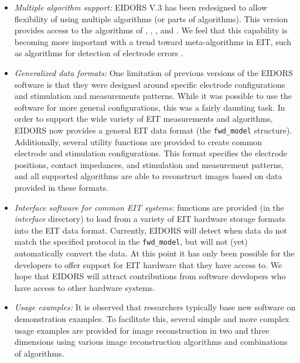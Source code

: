 \documentclass[12pt]{iopart}
\begin{document}
\begin{itemize}

  \item {\em Multiple algorithm support:}
EIDORS V.3 has been redesigned to allow flexibility of
using multiple algorithms (or parts of algorithms). 
This version provides access to the algorithms of
\cite{Adler_and_Guardo_1996}, \cite{Borsic_2002},
\cite{Polydorides_and_Lionheart_2002},
\cite{Soleimani_etal_2005} and \cite{Vauhkonen_etal_2000}.
We feel that this capability is becoming more
important with a trend toward meta-algorithms
in EIT, such as algorithms for detection of
electrode errors \cite{Asfaw_and_Adler_2005}. 

  \item {\em Generalized data formats:}
One limitation of previous versions of the EIDORS software
is that they were designed around specific electrode configurations
and stimulation and measurements patterns. While it was possible
to use the software for more general configurations, this was 
a fairly daunting task. In order to support the wide
variety of EIT measurements and algorithms, EIDORS now provides
a general EIT data format (the {\tt fwd\_model} structure).
Additionally, several utility functions are provided to
create common electrode and stimulation configurations.
This format specifies the electrode positions, contact impedances,
and stimulation and measurement patterns, and all supported
algorithms are able to reconstruct images based on data
provided in these formats.

  \item {\em Interface software for common EIT systems:}
functions are provided (in the {\em interface} directory) to load
from a variety of EIT hardware storage formats into the
EIT data format. Currently, EIDORS will detect when data
do not match the specified protocol in the {\tt fwd\_model},
but will not (yet) automatically convert the data.
At this point it has only been possible for the developers to 
offer support for EIT hardware that they have access
to. We hope that EIDORS will attract contributions from
software developers who have access to other hardware
systems.

  \item {\em Usage examples:}
It is observed that researchers typically base new software on
demonstration examples. To facilitate this, several simple and more
complex usage examples are provided for image reconstruction
in two and three dimensions using various image reconstruction
algorithms and combinations of algorithms.


\end{itemize}
\end{document}
